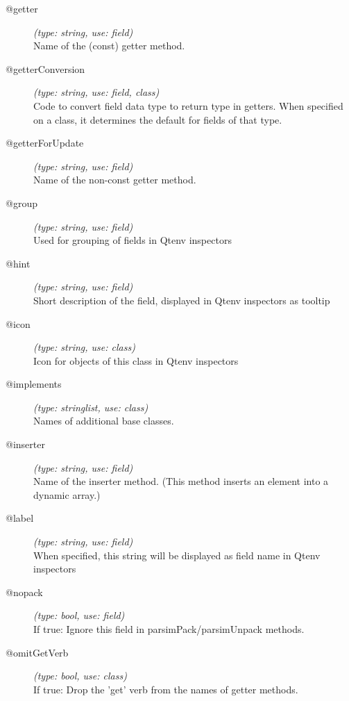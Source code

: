 \begin{description}
\item[@getter] \textit{(type: string, use: field)} \\
  Name of the (const) getter method.

\item[@getterConversion] \textit{(type: string, use: field, class)} \\
  Code to convert field data type to return type in getters. When specified on
  a class, it determines the default for fields of that type.

\item[@getterForUpdate] \textit{(type: string, use: field)} \\
  Name of the non-const getter method.

\item[@group] \textit{(type: string, use: field)} \\
  Used for grouping of fields in Qtenv inspectors

\item[@hint] \textit{(type: string, use: field)} \\
  Short description of the field, displayed in Qtenv inspectors as tooltip

\item[@icon] \textit{(type: string, use: class)} \\
  Icon for objects of this class in Qtenv inspectors

\item[@implements] \textit{(type: stringlist, use: class)} \\
  Names of additional base classes.

\item[@inserter] \textit{(type: string, use: field)} \\
  Name of the inserter method. (This method inserts an element into a dynamic
  array.)

\item[@label] \textit{(type: string, use: field)} \\
  When specified, this string will be displayed as field name in Qtenv
  inspectors

\item[@nopack] \textit{(type: bool, use: field)} \\
  If true: Ignore this field in parsimPack/parsimUnpack methods.

\item[@omitGetVerb] \textit{(type: bool, use: class)} \\
  If true: Drop the 'get' verb from the names of getter methods.


\end{description}
